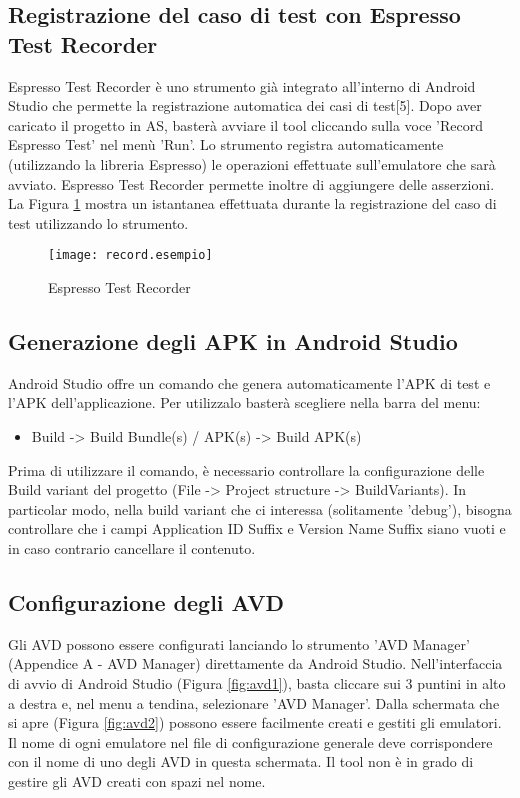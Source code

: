 \subsection*{Registrazione del caso di test con Espresso Test Recorder}

Espresso Test Recorder è uno strumento già integrato all’interno di Android Studio che permette la registrazione automatica dei casi di test[5]. Dopo aver caricato il progetto in AS, basterà avviare il tool cliccando sulla voce 'Record Espresso Test' nel menù 'Run'.  Lo strumento registra automaticamente (utilizzando la libreria Espresso) le operazioni effettuate sull'emulatore che sarà avviato.  Espresso Test Recorder permette inoltre di aggiungere delle asserzioni. La Figura \ref{fig:record.esempio} mostra un istantanea effettuata durante la registrazione del caso di test utilizzando lo strumento.
\begin{figure}[H]
	\texttt{[image: record.esempio]}
	\centering
	\caption{Espresso Test Recorder}
    \label{fig:record.esempio}
\end{figure}

\subsection*{Generazione degli APK in Android Studio}

Android Studio offre un comando che genera automaticamente l'APK di test e l'APK dell'applicazione. Per utilizzalo basterà scegliere nella barra del menu:
\begin{itemize} [nosep]
\item [] Build -> Build Bundle(s) / APK(s) -> Build APK(s)
\end{itemize}
Prima di utilizzare il comando, è necessario controllare la configurazione delle Build variant del progetto (File -> Project structure -> BuildVariants). In particolar modo, nella build variant che ci interessa (solitamente 'debug'), bisogna controllare che i campi Application ID Suffix e Version Name Suffix siano vuoti e in caso contrario cancellare il contenuto. 


\subsection*{Configurazione degli AVD}
Gli AVD possono essere configurati lanciando lo strumento 'AVD Manager' (Appendice A - AVD Manager) direttamente da Android Studio. Nell'interfaccia di avvio di Android Studio (Figura \ref{fig:avd1}), basta cliccare sui 3 puntini in alto a destra e, nel menu a tendina, selezionare 'AVD Manager'. Dalla schermata che si apre (Figura \ref{fig:avd2}) possono essere facilmente creati e gestiti gli emulatori. Il nome di ogni emulatore nel file di configurazione generale deve corrispondere con il nome di uno degli AVD in questa schermata. Il tool non è in grado di gestire gli AVD creati con spazi nel nome.

